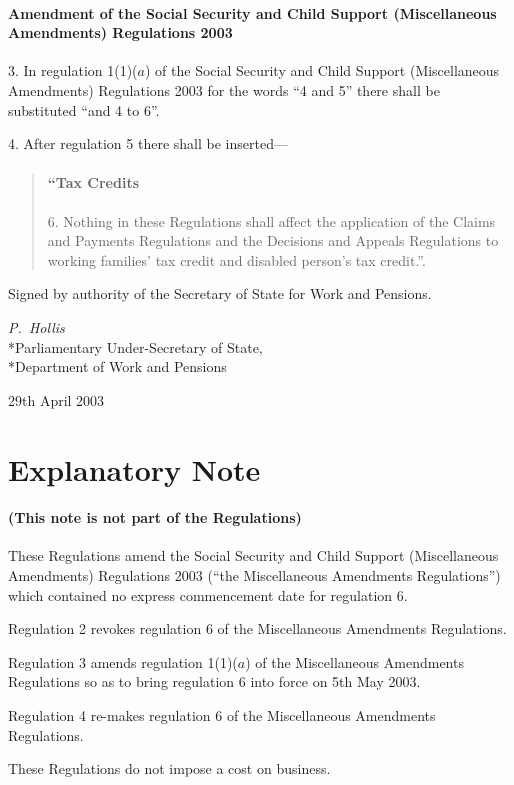 \documentclass[12pt,a4paper]{article}
\begin{document}
\subsection[3. Amendment of the Social Security and Child Support (Miscellaneous Amendments) Regulations 2003]{Amendment of the Social Security and Child Support (Miscellaneous Amendments) Regulations 2003}

3.  In regulation 1(1)($a$)  of the Social Security and Child Support (Miscellaneous Amendments) Regulations 2003 for the words “4 and 5” there shall be substituted “and 4 to 6”.

\medskip

4.  After regulation 5 there shall be inserted—
\begin{quotation}
\subsection*{“Tax Credits}

6.  Nothing in these Regulations shall affect the application of the Claims and Payments Regulations and the Decisions and Appeals Regulations to working families' tax credit and disabled person’s tax credit.”.
\end{quotation}

\bigskip

Signed 
by authority of the Secretary of State for Work and Pensions.

{\raggedleft
\emph{P.~Hollis}\\*Parliamentary Under-Secretary of State,\\*Department of Work and Pensions

}


29th April 2003

\small

\part{Explanatory Note}

\renewcommand\parthead{— Explanatory Note}

\subsection*{(This note is not part of the Regulations)}

These Regulations amend the Social Security and Child Support (Miscellaneous Amendments) Regulations 2003 (“the Miscellaneous Amendments Regulations”) which contained no express commencement date for regulation 6.

Regulation 2 revokes regulation 6 of the Miscellaneous Amendments Regulations.

Regulation 3 amends regulation 1(1)($a$)  of the Miscellaneous Amendments Regulations so as to bring regulation 6 into force on 5th May 2003.

Regulation 4 re-makes regulation 6 of the Miscellaneous Amendments Regulations.

These Regulations do not impose a cost on business. 
\end{document}
